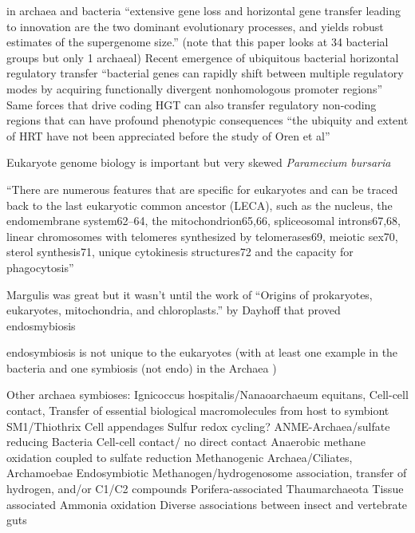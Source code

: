 in archaea and bacteria ``extensive gene loss and horizontal gene transfer leading to innovation are the two dominant evolutionary processes, and yields robust estimates of the supergenome size.''
(note that this paper looks at 34 bacterial groups but only 1 archaeal) \citep{Puigbo2014}
Recent emergence of ubiquitous bacterial horizontal regulatory transfer 
``bacterial genes can rapidly shift between multiple regulatory modes by acquiring functionally divergent nonhomologous promoter regions'' 
Same forces that drive coding HGT can also transfer regulatory non-coding regions that can have profound phenotypic consequences \citep{Oren2014}
``the ubiquity and extent of HRT have not been appreciated before the study of Oren et al'' \citep{Koonin2014}



Eukaryote genome biology is important but very skewed \citep{DelCampo2014}
\textit{Paramecium bursaria} 


``There are numerous features that are specific for eukaryotes and can be traced back to the last 
eukaryotic common ancestor (LECA), such as the nucleus, the endomembrane system62–64, the 
mitochondrion65,66, spliceosomal introns67,68, linear chromosomes with telomeres synthesized by 
telomerases69, meiotic sex70, sterol synthesis71, unique cytokinesis structures72 and the capacity 
for phagocytosis'' \citep{Gribaldo2010}



Margulis was great but it wasn't until the work of ``Origins of prokaryotes, eukaryotes, mitochondria, and chloroplasts.'' by Dayhoff that proved endosmybiosis \citep{Schwartz1976}




endosymbiosis is not unique to the eukaryotes (with at least one example in the
bacteria \citep{vonDohlen2001} and one symbiosis (not endo) in the Archaea \citep{Huber2002})


Other archaea symbioses:
Ignicoccus hospitalis/Nanaoarchaeum equitans, Cell-cell contact, Transfer of essential biological macromolecules from host to symbiont
SM1/Thiothrix   Cell appendages Sulfur redox cycling?
ANME-Archaea/sulfate reducing Bacteria  Cell-cell contact/ no direct contact    Anaerobic methane oxidation coupled to sulfate reduction
Methanogenic Archaea/Ciliates, Archamoebae   Endosymbiotic   Methanogen/hydrogenosome association, transfer of hydrogen, and/or C1/C2 compounds
Porifera-associated Thaumarchaeota  Tissue associated   Ammonia oxidation
Diverse associations between insect and vertebrate guts
\citep{Wrede2012}





